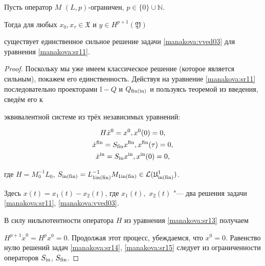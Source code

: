 \begin{theorem}

Пусть оператор $M$ $(L, p)$-ограничен{\rm ,} $p\in\{0\}\cup \mathbb N$.

Тогда для любых $x_0, x_{\tau}\in\mathfrak X$ и $y\in{H}^{p+1} (\mathfrak Y)$

существует единственное сильное решение задачи \eqref{manakova:vved03} для уравнения \eqref{manakova:sr11}.

\end{theorem}

\begin{proof}

Поскольку мы уже имеем классическое решение (которое является сильным), покажем его единственность. Действуя на уравнение \eqref{manakova:sr11} последовательно проекторами ${\mathbb

I}-Q$ и  $Q_{\rm fin(in)}$ и пользуясь теоремой из введения, сведём его к

эквивалентной системе из трёх не\-за\-ви\-си\-мых уравнений:

\begin{gather}\label{manakova:sr13}

    H\dot x^0 = x^0, x^0(0) = 0,

\\

\label{manakova:sr14}

    \dot x^{\rm fin} = S_{\rm fin} x^{\rm fin}, x^{\rm fin}(\tau) = 0,

\\

\label{manakova:sr15}

\dot x^{\rm in} = S_{\rm in} x^{\rm in}, x^{\rm in}(0) = 0,

\end{gather}

где $H = M_0^{-1}L_0$, $S_{\rm in(fin)} = L_{\rm 1in(fin)}^{-1} M_{ \rm 1 in(fin)}\in{\cal L}({\mathfrak U}^1_{\rm in(fin)})$.

Здесь $x(t) = x_1(t)- x_2(t)$, где $x_1(t),$ $ x_2(t)$ "--- два решения задачи \eqref{manakova:sr11}, \eqref{manakova:vved03}.



В силу нильпотентности оператора $H$ из уравнения \eqref{manakova:sr13} получаем \linebreak

$H^{p+1}\dot x^0 = H^p x^0 = 0$. Продолжая этот процесс, убеждаемся, что $ x^0 = 0$. Равенство нулю решений задач \eqref{manakova:sr14}, \eqref{manakova:sr15} следует из ограниченности операторов $S_{\rm in}$, $S_{\rm fin}$.

\end{proof}



